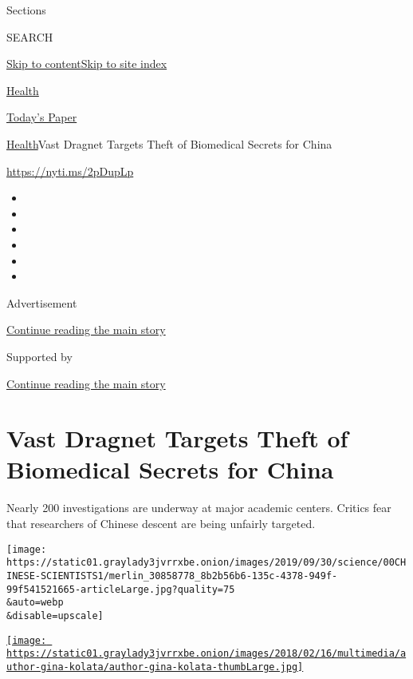 Sections

SEARCH

\protect\hyperlink{site-content}{Skip to
content}\protect\hyperlink{site-index}{Skip to site index}

\href{https://www.nytimes3xbfgragh.onion/section/health}{Health}

\href{https://myaccount.nytimes3xbfgragh.onion/auth/login?response_type=cookie\&client_id=vi}{}

\href{https://www.nytimes3xbfgragh.onion/section/todayspaper}{Today's
Paper}

\href{/section/health}{Health}\textbar{}Vast Dragnet Targets Theft of
Biomedical Secrets for China

\url{https://nyti.ms/2pDupLp}

\begin{itemize}
\item
\item
\item
\item
\item
\item
\end{itemize}

Advertisement

\protect\hyperlink{after-top}{Continue reading the main story}

Supported by

\protect\hyperlink{after-sponsor}{Continue reading the main story}

\hypertarget{vast-dragnet-targets-theft-of-biomedical-secrets-for-china}{%
\section{Vast Dragnet Targets Theft of Biomedical Secrets for
China}\label{vast-dragnet-targets-theft-of-biomedical-secrets-for-china}}

Nearly 200 investigations are underway at major academic centers.
Critics fear that researchers of Chinese descent are being unfairly
targeted.

\texttt{[image: https://static01.graylady3jvrrxbe.onion/images/2019/09/30/science/00CHINESE-SCIENTISTS1/merlin\_30858778\_8b2b56b6-135c-4378-949f-99f541521665-articleLarge.jpg?quality=75\\\&auto=webp\\\&disable=upscale]}

\href{https://www.nytimes3xbfgragh.onion/by/gina-kolata}{\texttt{[image: https://static01.graylady3jvrrxbe.onion/images/2018/02/16/multimedia/author-gina-kolata/author-gina-kolata-thumbLarge.jpg]}}


